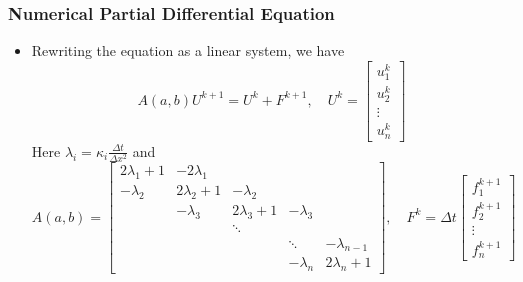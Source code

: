 \documentclass{beamer}
\begin{document}
\begin{frame}
	\frametitle{Numerical Partial Differential Equation}

	\begin{itemize}
		\item Rewriting the equation as a linear system, we have
		      $$A(a,b)U^{k+1} = U^k + F^{k+1}, \quad U^k = \begin{bmatrix}u_1^k\\u_2^k\\\vdots \\u_n^k\end{bmatrix}$$
		      Here $\lambda_i = \kappa_i \frac{\Delta t}{\Delta x^2}$ and
			      {\footnotesize
				      \begin{equation*}
					      A(a,b) = \begin{bmatrix}
						      2\lambda_1+1 & -2\lambda_1  &                &            &                \\
						      -\lambda_2   & 2\lambda_2+1 & -\lambda_2     &            &                \\
						                   & -\lambda_3   & 2\lambda_3 + 1 & -\lambda_3 &                \\
						                   &              & \ddots         &            &                \\
						                   &              &                & \ddots     & -\lambda_{n-1} \\
						                   &              &                & -\lambda_n & 2\lambda_n+1
					      \end{bmatrix},\quad F^k = \Delta t \begin{bmatrix}
						      f_1^{k+1} \\
						      f_2^{k+1} \\
						      \vdots    \\
						      f_n^{k+1}
					      \end{bmatrix}
				      \end{equation*}
			      }

	\end{itemize}
\end{frame}
\end{document}
